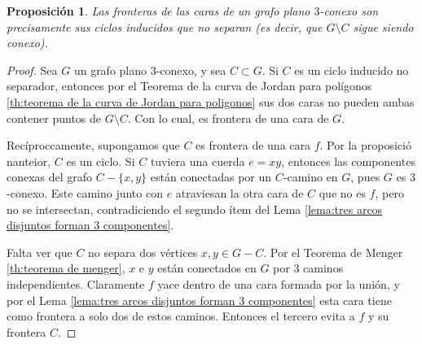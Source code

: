 \documentclass[12pt]{report}
\theoremstyle{plain}
\newtheorem{proposition}[theorem]{Proposición}
\theoremstyle{definition}
\begin{document}
\begin{proposition}\label{proposition:las fronteras de las caras de un grafo plano 3-conexo son precisamente sus ciclos inducidos que no separan}
Las fronteras de las caras de un grafo plano $3$-conexo son precisamente sus ciclos inducidos que no separan (es decir, que $G \setminus C$ sigue siendo conexo).
\end{proposition}
\begin{proof}
Sea $G$ un grafo plano $3$-conexo, y sea $C \subset G$. Si $C$ es un ciclo inducido no separador, entonces por el Teorema de la curva de Jordan para polígonos \ref{th:teorema de la curva de Jordan para poligonos} sus dos caras no pueden ambas contener puntos de $G \setminus C$. Con lo cual, es frontera de una cara de $G$.

Recíproccamente, supongamos que $C$ es frontera de una cara $f$. Por la proposició nanteior, $C$ es un ciclo. Si $C$ tuviera una cuerda $e = xy$, entonces las componentes conexas del grafo $C - \{x,y\}$ están conectadas por un $C$-camino en $G$, pues $G$ es $3$-conexo. Este camino junto con $e$ atraviesan la otra cara de $C$ que no es $f$, pero no se intersectan, contradiciendo el segundo ítem del Lema \ref{lema:tres arcos disjuntos forman 3 componentes}.

Falta ver que $C$ no separa dos vértices $x,y \in G - C$. Por el Teorema de Menger \ref{th:teorema de menger}, $x$ e $y$ están conectados en $G$ por $3$ caminos independientes. Claramente $f$ yace dentro de una cara formada por la unión, y por el Lema \ref{lema:tres arcos disjuntos forman 3 componentes} esta cara tiene como frontera a solo dos de estos caminos. Entonces el tercero evita a $f$ y su frontera $C$.
\end{proof}
\end{document}
